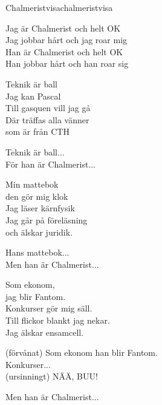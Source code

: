 \begin{song}{Chalmeristvisa}{chalmeristvisa}
\begin{vers}
Jag är Chalmerist och helt OK \\
Jag jobbar hårt och jag roar mig\\
Han är Chalmerist och helt OK\\
Han jobbar hårt och han roar sig\\
\end{vers}
\begin{vers}
Teknik är ball \\
Jag kan Pascal\\
Till gasquen vill jag gå\\
Där träffas alla vänner\\
som är från CTH\\
\end{vers}
\begin{vers}
Teknik är ball...\\
För han är Chalmerist...\\
\end{vers}
\begin{vers}
Min mattebok \\
den gör mig klok\\
Jag läser kärnfysik\\
Jag går på föreläsning\\
och älskar juridik.\\
\end{vers}
\begin{vers}
Hans mattebok...\\
Men han är Chalmerist...\\
\end{vers}

\newp

\begin{vers}
Som ekonom,\\
jag blir Fantom.\\
Konkurser gör mig säll.\\
Till flickor blankt jag nekar.\\
Jag älskar ensamcell.\\
\end{vers}
\begin{vers}
(förvånat) Som ekonom han blir Fantom.\\
Konkurser...\\
(ursinningt) NÄÄ, BUU!\\
\end{vers}
\begin{vers}
Men han är Chalmerist...\\
\end{vers}
\end{song}
